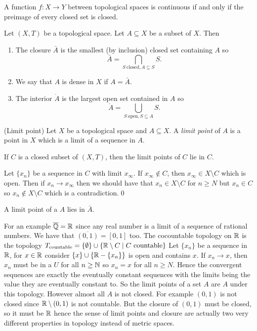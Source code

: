 \documentclass{article}
\begin{document}
\begin{proposition}
  A function $ f:X\to Y $ between topological spaces is continuous if and only if the preimage of every closed set is closed.
\end{proposition}
\begin{definition}
  Let $ (X,T) $ be a topological space. Let $ A\subseteq X $ be a subset of $ X $. Then
  \begin{enumerate}
	  \item The closure $ \bar A $ is the smallest (by inclusion) closed set containing $ A $ so
		  \[
			  \bar A = \bigcap_{S\ \text{closed}, A\subseteq S} S.
		  \]
	  \item We say that $ A $ is dense in $ X $ if $ A=\bar A $.
	  \item The interior $ \mathring{A} $ is the largest open set contained in $ A $ so
		  \[
			  \mathring{A} = \bigcup_{S\ \text{open}, S\subseteq A} S.
		  \]
  \end{enumerate}
\end{definition}
\begin{definition}
	(Limit point) Let $ X $ be a topological space and $ A\subseteq X $. A \textit{limit point} of $ A $ is a point in $ X $ which is a limit of a sequence in $ A $.
\end{definition}
\begin{proposition}
  If $ C $ is a closed subset of $ (X,T) $, then the limit points of $ C $ lie in $ C $.
\end{proposition}
\pf Let $ \{x_n\} $ be a sequence in $ C $ with limit $ x_\infty $. If $ x_\infty\notin C $, then $ x_\infty \in X\setminus C $ which is open. Then if $ x_n\to x_\infty $ then we should have that $ x_n\in X\setminus C $ for $ n\ge N $ but $ x_n\in C $ so $ x_n\notin X\setminus C $ which is a contradiction.\qed
\begin{corollary}
  A limit point of a $ A $ lies in $ \bar A $.
\end{corollary}
For an example $ \overline{\mathbb{Q}} = \mathbb{R} $ since any real number is a limit of a sequence of rational numbers. We have that $ \overline{(0,1)} = [0,1] $ too. The cocountable topology on $ \mathbb{R} $ is the topology $ T_{\text{countable}} = \{\emptyset\} \cup \{\mathbb{R} \setminus C \mid C \ \text{countable}\} $ Let $ \{x_n\} $ be a sequence in $ \mathbb{R} $, for $ x \in \mathbb{R} $ consider $ \{x\} \cup\{\mathbb{R} - \{x_n\}\} $ is open and contains $ x $. If $ x_n\to x $, then $ x_n $ must be in a $ U $ for all $ n\ge \mathbb{N} $ so $ x_n=x $ for all $ n\ge N $. Hence the convergent sequences are exactly the eventually constant sequences with the limits being the value they are eventually constant to. So the limit points of a set $ A $ are $ A $ under this topology. However almost all $ A $ is not closed. For example $ (0,1) $ is not closed since $ \mathbb{R}\setminus (0,1) $ is not countable. But the closure of $ (0,1) $ must be closed, so it must be $ \mathbb{R} $ hence the sense of limit points and closure are actually two very different properties in topology instead of metric spaces.
\end{document}

